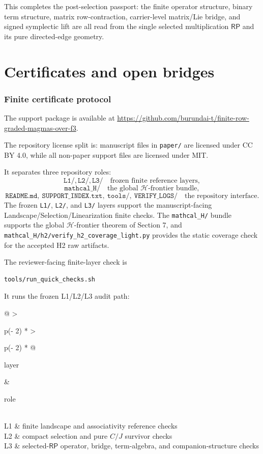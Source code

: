 \documentclass[11pt]{article}
\theoremstyle{definition}
\newcommand{\RP}{\mathsf{RP}}
\begin{document}
This completes the post-selection passport: the finite operator structure,
binary term structure, matrix row-contraction, carrier-level matrix/Lie bridge,
and signed symplectic lift are all read from the single selected multiplication
\(\RP\) and its pure directed-edge geometry.

\part{Certificates and open bridges}

\section{Finite certificate protocol}\label{finite-certificate-protocol}

The support package is available at
\url{https://github.com/burundai-t/finite-row-graded-magmas-over-f3}.

The repository license split is: manuscript files in \texttt{paper/} are
licensed under CC BY 4.0, while all non-paper support files are licensed
under MIT.

It separates three repository roles:
\[
\texttt{L1/},\texttt{L2/},\texttt{L3/}
\quad
\text{frozen finite reference layers},
\]
\[
\texttt{mathcal\_H/}
\quad
\text{the global }\mathcal H\text{-frontier bundle},
\]
\[
\texttt{README.md},\ \texttt{SUPPORT\_INDEX.txt},\ \texttt{tools/},\
\texttt{VERIFY\_LOGS/}
\quad
\text{the repository interface}.
\]
The frozen \texttt{L1/}, \texttt{L2/}, and \texttt{L3/} layers support the
manuscript-facing Landscape/Selection/Linearization finite checks.  The
\texttt{mathcal\_H/} bundle supports the global \(\mathcal H\)-frontier
theorem of Section 7, and
\texttt{mathcal\_H/h2/verify\_h2\_coverage\_light.py} provides the
static coverage check for the accepted H2 raw artifacts.

The reviewer-facing finite-layer check is

\begin{verbatim}
tools/run_quick_checks.sh
\end{verbatim}

It runs the frozen L1/L2/L3 audit path:

\begin{longtable}[]{@{}
  >{\raggedright\arraybackslash}p{(\columnwidth - 2\tabcolsep) * }
  >{\raggedright\arraybackslash}p{(\columnwidth - 2\tabcolsep) * \real{0.5000}}@{}}
\toprule\noalign{}
\begin{minipage}[b]{\linewidth}\raggedright
layer
\end{minipage} & \begin{minipage}[b]{\linewidth}\raggedright
role
\end{minipage} \\
\midrule\noalign{}
\endhead
\bottomrule\noalign{}
\endlastfoot
L1 & finite landscape and associativity reference checks \\
L2 & compact selection and pure \(C/J\) survivor checks \\
L3 & selected-\(\RP\) operator, bridge, term-algebra, and companion-structure checks \\
\end{longtable}
\end{document}
